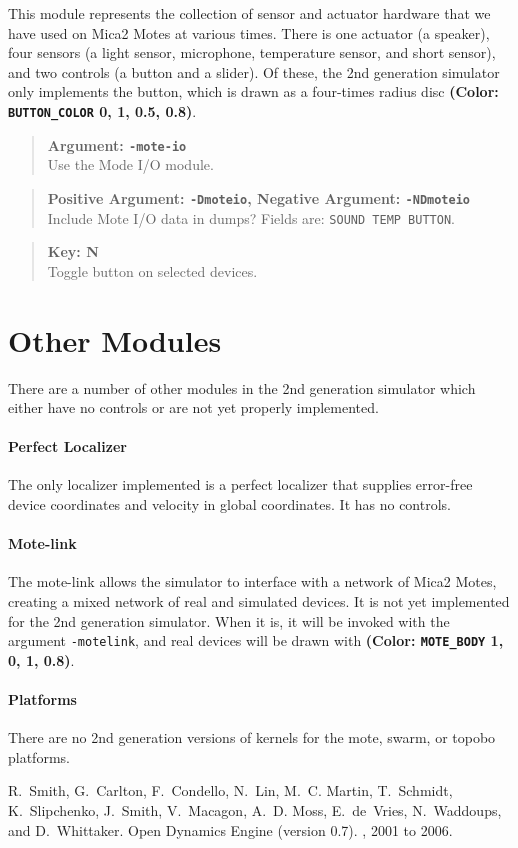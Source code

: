 \documentclass{article}
\newcommand\var[1]{{\tt #1}}
\newcommand\key[1]{{\bf #1}}
\newcommand\simarg[2]{\begin{quote} {\bf Argument: \var{#1}} \\ #2 \end{quote}}
\newcommand\simkey[2]{\begin{quote} {\bf Key: \key{#1}} \\ #2 \end{quote}}
\newcommand\simPMarg[3]{
  \begin{quote}
    {\bf Positive Argument: \var{#1}, Negative Argument: \var{#2}} \\ #3
  \end{quote}
}
\newcommand\color[5]{{\bf (Color: {\tt #1} #2, #3, #4, #5)}} %
\begin{document}
This module represents the collection of sensor and actuator hardware
that we have used on Mica2 Motes at various times.  There is one actuator
(a speaker), four sensors (a light sensor, microphone, temperature sensor,
and short sensor), and two controls (a button and a slider).  Of these,
the 2nd generation simulator only implements the button, which is
drawn as a four-times radius disc \color{BUTTON\_COLOR}{0}{1}{0.5}{0.8}.

\simarg{-mote-io}{Use the Mode I/O module.}
\simPMarg{-Dmoteio}{-NDmoteio}{Include Mote I/O data in dumps?
  Fields are: \var{SOUND TEMP BUTTON}.}
\simkey{N}{Toggle button on selected devices.}


\section{Other Modules}

There are a number of other modules in the 2nd generation simulator
which either have no controls or are not yet properly implemented.

\paragraph{Perfect Localizer} 
The only localizer implemented is a perfect localizer that supplies
error-free device coordinates and velocity in global coordinates.  It
has no controls.

\paragraph{Mote-link}

The mote-link allows the simulator to interface with a network of
Mica2 Motes, creating a mixed network of real and simulated devices.
It is not yet implemented for the 2nd generation simulator.  When it
is, it will be invoked with the argument \var{-motelink}, and real
devices will be drawn with \color{MOTE\_BODY}{1}{0}{1}{0.8}.

\paragraph{Platforms}

There are no 2nd generation versions of kernels for the mote, swarm,
or topobo platforms.

\begin{thebibliography}{}
R.~Smith, G.~Carlton, F.~Condello, N.~Lin, M.~C. Martin, T.~Schmidt,
  K.~Slipchenko, J.~Smith, V.~Macagon, A.~D. Moss, E.~de~Vries, N.~Waddoups,
  and D.~Whittaker.
\newblock Open Dynamics Engine (version 0.7).
, 2001 to 2006.
\end{thebibliography}
\end{document}
